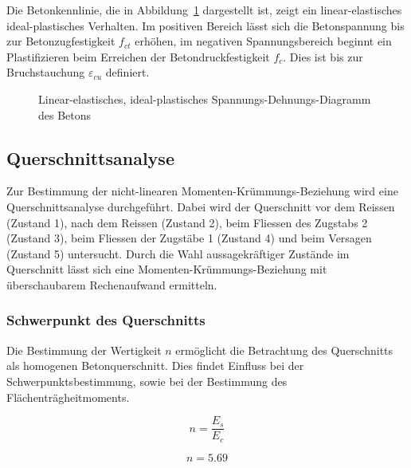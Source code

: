 \documentclass[
  12pt,
  letterpaper,
  egregdoesnotlikesansseriftitles]{scrreprt}
\begin{document}
Die Betonkennlinie, die in Abbildung~\ref{fig-betonkennlinie_sv14}
dargestellt ist, zeigt ein linear-elastisches ideal-plastisches
Verhalten. Im positiven Bereich lässt sich die Betonspannung bis zur
Betonzugfestigkeit \(f_{ct}\) erhöhen, im negativen Spannungsbereich
beginnt ein Plastifizieren beim Erreichen der Betondruckfestigkeit
\(f_c\). Dies ist bis zur Bruchstauchung \(\varepsilon_{cu}\) definiert.

\begin{figure}[H]


\caption{\label{fig-betonkennlinie_sv14}Linear-elastisches,
ideal-plastisches Spannungs-Dehnungs-Diagramm des Betons}

\end{figure}%

\subsection{Querschnittsanalyse}\label{querschnittsanalyse-1}

Zur Bestimmung der nicht-linearen Momenten-Krümmungs-Beziehung wird eine
Querschnittsanalyse durchgeführt. Dabei wird der Querschnitt vor dem
Reissen (Zustand 1), nach dem Reissen (Zustand 2), beim Fliessen des
Zugstabs 2 (Zustand 3), beim Fliessen der Zugstäbe 1 (Zustand 4) und
beim Versagen (Zustand 5) untersucht. Durch die Wahl aussagekräftiger
Zustände im Querschnitt lässt sich eine Momenten-Krümmungs-Beziehung mit
überschaubarem Rechenaufwand ermitteln.

\subsubsection{Schwerpunkt des
Querschnitts}\label{schwerpunkt-des-querschnitts-1}

Die Bestimmung der Wertigkeit \(n\) ermöglicht die Betrachtung des
Querschnitts als homogenen Betonquerschnitt. Dies findet Einfluss bei
der Schwerpunktsbestimmung, sowie bei der Bestimmung des
Flächenträgheitmoments.

\begin{equation}n = \frac{E_{s}}{E_{c}}\end{equation}

\begin{equation}n = 5.69\end{equation}
\end{document}
